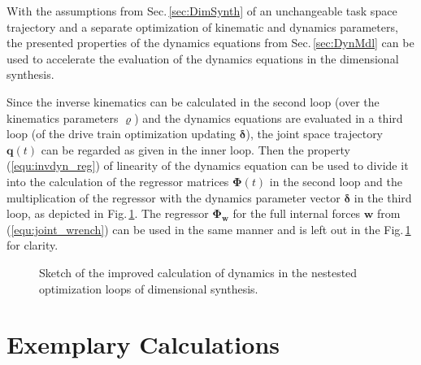 \documentclass{svproc}
\newcommand{\bm}[1]{\boldsymbol{#1}}
\begin{document}
With the assumptions from Sec.\,\ref{sec:DimSynth} of an unchangeable task space trajectory and a separate optimization of kinematic and dynamics parameters, the presented properties of the dynamics equations from Sec.\,\ref{sec:DynMdl} can be used to accelerate the evaluation of the dynamics equations in the dimensional synthesis.

Since the inverse kinematics can be calculated in the second loop (over the kinematics parameters $\bm{\varrho}$) and the dynamics equations are evaluated in a third loop (of the drive train optimization updating $\bm{\delta}$), the joint space trajectory $\bm{q}(t)$ can be regarded as given in the inner loop.
Then the property (\ref{equ:invdyn_reg}) of linearity of the dynamics equation can be used to divide it into the calculation of the regressor matrices $\bm{\Phi}(t)$ in the second loop and the multiplication of the regressor with the dynamics parameter vector  $\bm{\delta}$ in the third loop, as depicted in Fig.\,\ref{fig:dimsynth_dyn_plin}.
The regressor $\bm{\Phi}_{\bm{w}}$ for the full internal forces $\bm{w}$ from (\ref{equ:joint_wrench}) can be used in the same manner and is left out in the Fig.\,\ref{fig:dimsynth_dyn_plin} for clarity.

\begin{figure}[tb]
    
    \caption{Sketch of the improved calculation of dynamics in the nestested optimization loops of dimensional synthesis.}
    \label{fig:dimsynth_dyn_plin}
\end{figure} 




\section{Exemplary Calculations}
\label{sec:Example}
\end{document}
